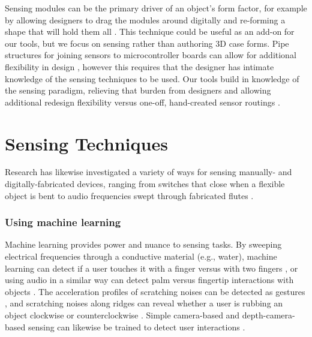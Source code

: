     Sensing modules can be the primary driver of an object's form factor, for example by allowing designers to drag the modules around digitally and re-forming a shape that will hold them all \cite{weichel-enclosed}. This technique could be useful as an add-on for our tools, but we focus on sensing rather than authoring 3D case forms. Pipe structures for joining sensors to microcontroller boards can allow for additional flexibility in design \cite{savage-sot}, however this requires that the designer has intimate knowledge of the sensing techniques to be used. Our tools build in knowledge of the sensing paradigm, relieving that burden from designers and allowing additional redesign flexibility versus one-off, hand-created sensor routings \cite{navarrette-gps, park-microchannels}.

\section{Sensing Techniques}

    Research has likewise investigated a variety of ways for sensing manually- and digitally-fabricated devices, ranging from switches that close when a flexible object is bent \cite{slyper-structure} to audio frequencies swept through fabricated flutes \cite{laput-acoustruments}.

    \subsubsection{Using machine learning}
        Machine learning provides power and nuance to sensing tasks. By sweeping electrical frequencies through a conductive material (e.g., water), machine learning can detect if a user touches it with a finger versus with two fingers \cite{sato-touche}, or using audio in a similar way can detect palm versus fingertip interactions with objects \cite{ono-touchandactivate}. The acceleration profiles of scratching noises can be detected as gestures \cite{harrison-scratchinput}, and scratching noises along ridges can reveal whether a user is rubbing an object clockwise or counterclockwise \cite{murray-smith-stane}. Simple camera-based and depth-camera-based sensing can likewise be trained to detect user interactions  \cite{fails-crayons,holman-sketchspace,klemmer-papiermache,macintyre-DART}.
        
